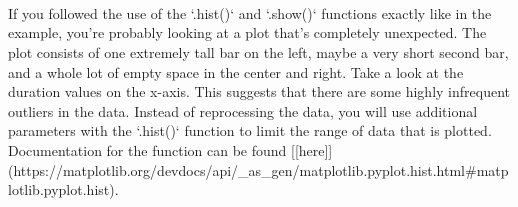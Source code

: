 \documentclass[11pt]{article}
\begin{document}
    \begin{center}
    \end{center}
    { \hspace*{\fill} \\}
    
    \begin{center}
    \end{center}
    { \hspace*{\fill} \\}
    
    \begin{center}
    \end{center}
    { \hspace*{\fill} \\}
    If you followed the use of the `.hist()` and `.show()` functions exactly like in the example, you're probably looking at a plot that's completely unexpected. The plot consists of one extremely tall bar on the left, maybe a very short second bar, and a whole lot of empty space in the center and right. Take a look at the duration values on the x-axis. This suggests that there are some highly infrequent outliers in the data. Instead of reprocessing the data, you will use additional parameters with the `.hist()` function to limit the range of data that is plotted. Documentation for the function can be found [[here]](https://matplotlib.org/devdocs/api/_as_gen/matplotlib.pyplot.hist.html#matplotlib.pyplot.hist).
\end{document}
